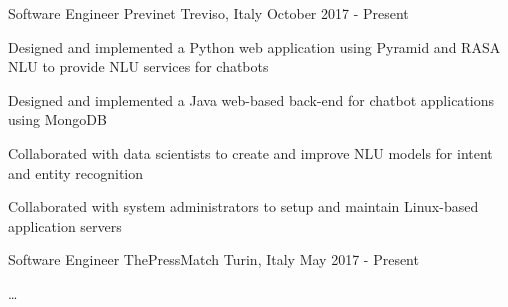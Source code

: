 

\begin{cventries}

  \cventry
    {Software Engineer} %
    {Previnet} %
    {Treviso, Italy} %
    {October 2017 - Present} %
    {
      \begin{cvitems} %
        \item {Designed and implemented a Python web application using Pyramid and RASA NLU to provide NLU services for chatbots}
        \item {Designed and implemented a Java web-based back-end for chatbot applications using MongoDB}
        \item {Collaborated with data scientists to create and improve NLU models for intent and entity recognition}
        \item {Collaborated with system administrators to setup and maintain Linux-based application servers}
      \end{cvitems}
    }

\cventry
{Software Engineer} %
{ThePressMatch} %
{Turin, Italy} %
{May 2017 - Present} %
{
  \begin{cvitems} %
    \item {\ldots}
  \end{cvitems}
}


\end{cventries}
